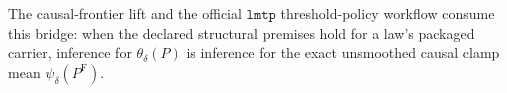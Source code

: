 The causal-frontier lift and the official \(\texttt{lmtp}\) threshold-policy workflow consume this bridge: when the declared structural premises hold for a law's packaged carrier, inference for \(\theta_\delta(P)\) is inference for the exact unsmoothed causal clamp mean \(\psi_\delta(P^{\mathrm F})\).